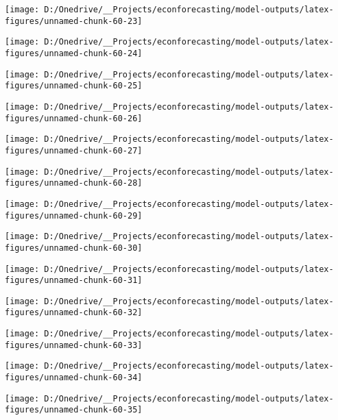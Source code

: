 \documentclass[11pt, letterpaper]{article}\usepackage[]{graphicx}\usepackage[]{color}
\begin{document}
{\centering \texttt{[image: D:/Onedrive/\_\_Projects/econforecasting/model-outputs/latex-figures/unnamed-chunk-60-23]} 

}




{\centering \texttt{[image: D:/Onedrive/\_\_Projects/econforecasting/model-outputs/latex-figures/unnamed-chunk-60-24]} 

}




{\centering \texttt{[image: D:/Onedrive/\_\_Projects/econforecasting/model-outputs/latex-figures/unnamed-chunk-60-25]} 

}




{\centering \texttt{[image: D:/Onedrive/\_\_Projects/econforecasting/model-outputs/latex-figures/unnamed-chunk-60-26]} 

}




{\centering \texttt{[image: D:/Onedrive/\_\_Projects/econforecasting/model-outputs/latex-figures/unnamed-chunk-60-27]} 

}




{\centering \texttt{[image: D:/Onedrive/\_\_Projects/econforecasting/model-outputs/latex-figures/unnamed-chunk-60-28]} 

}




{\centering \texttt{[image: D:/Onedrive/\_\_Projects/econforecasting/model-outputs/latex-figures/unnamed-chunk-60-29]} 

}




{\centering \texttt{[image: D:/Onedrive/\_\_Projects/econforecasting/model-outputs/latex-figures/unnamed-chunk-60-30]} 

}




{\centering \texttt{[image: D:/Onedrive/\_\_Projects/econforecasting/model-outputs/latex-figures/unnamed-chunk-60-31]} 

}




{\centering \texttt{[image: D:/Onedrive/\_\_Projects/econforecasting/model-outputs/latex-figures/unnamed-chunk-60-32]} 

}




{\centering \texttt{[image: D:/Onedrive/\_\_Projects/econforecasting/model-outputs/latex-figures/unnamed-chunk-60-33]} 

}




{\centering \texttt{[image: D:/Onedrive/\_\_Projects/econforecasting/model-outputs/latex-figures/unnamed-chunk-60-34]} 

}




{\centering \texttt{[image: D:/Onedrive/\_\_Projects/econforecasting/model-outputs/latex-figures/unnamed-chunk-60-35]} 

}
\end{document}
